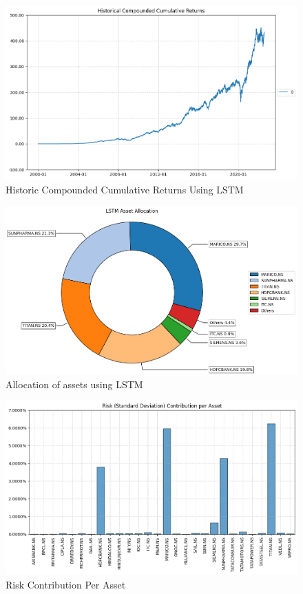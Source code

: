 \begin{figure}[H]
\centering
   \includegraphics[width=1.0\textwidth]{LSTM/Historic.png}
      \caption{Historic Compounded Cumulative Returns Using LSTM}
       \label{LSTM_HCCR}
\end{figure}

\begin{figure}[H]
\centering
   \includegraphics[width=1.0\textwidth]{LSTM/Allocation.png}
      \caption{Allocation of assets using LSTM}
       \label{LSTM_Alloc}
\end{figure}

\begin{figure}[H]
\centering
   \includegraphics[width=1.0\textwidth]{LSTM/Risk.png}
      \caption{Risk Contribution Per Asset}
       \label{LSTM_Risk}
\end{figure}

